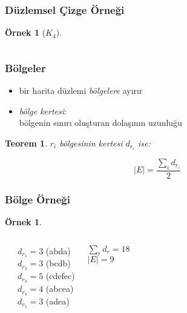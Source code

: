 \documentclass[dvipsnames]{beamer}
\theoremstyle{definition}
\theoremstyle{example}
\newtheorem{ornek}[theorem]{Örnek}
\theoremstyle{plain}
\newtheorem{teorem}[theorem]{Teorem}
\begin{document}
\begin{frame}
  \frametitle{Düzlemsel Çizge Örneği}

  \begin{ornek}[$K_4$]
    \begin{columns}
      \begin{center}
      \end{center}

      \begin{center}
      \end{center}
    \end{columns}
  \end{ornek}
\end{frame}

\begin{frame}
  \frametitle{Bölgeler}

  \begin{itemize}
    \item bir harita düzlemi \emph{bölgelere} ayırır
    \item \emph{bölge kertesi}:\\
      bölgenin sınırı oluşturan dolaşının uzunluğu
  \end{itemize}

  \pause
  \begin{teorem}
    $r_i$ bölgesinin kertesi $d_{r_i}$ ise:

    \[ |E| = \frac{\sum_i d_{r_i}}{2} \]
  \end{teorem}
\end{frame}

\begin{frame}
  \frametitle{Bölge Örneği}

  \begin{ornek}
    \begin{columns}
      \begin{center}
      \end{center}

      \pause
      $d_{r_1} = 3$ (abda)\\
      $d_{r_2} = 3$ (bcdb)\\
      $d_{r_3} = 5$ (cdefec)\\
      $d_{r_4} = 4$ (abcea)\\
      $d_{r_5} = 3$ (adea)

      \medskip
      $\sum_r d_r = 18$\\
      $|E| = 9$
    \end{columns}
  \end{ornek}
\end{frame}
\end{document}
